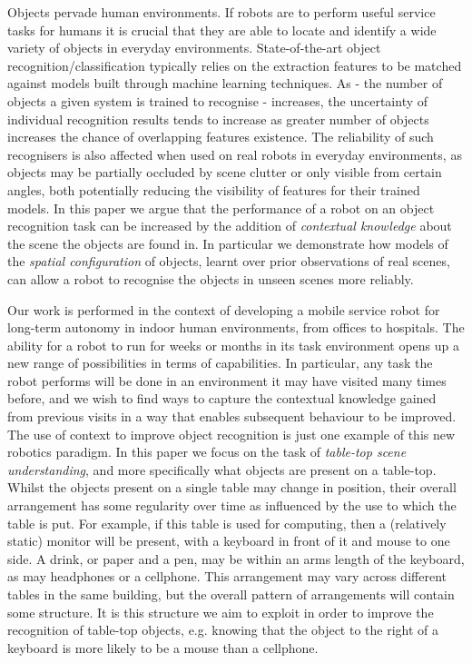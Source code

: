 \documentclass[letterpaper, 10 pt, conference]{ieeeconf}  %
\begin{document}
Objects pervade human environments. If robots are to perform useful service tasks for humans it is crucial that they are able to locate and identify a wide variety of objects in everyday environments. State-of-the-art object recognition/classification typically relies on the extraction features to be matched against models built through machine learning techniques. As - the number of objects a given system is trained to recognise - increases, the uncertainty of individual recognition results tends to increase as greater number of objects increases the chance of overlapping features existence. The reliability of such recognisers is also affected when used on real robots in everyday environments, as objects may be partially occluded by scene clutter or only visible from certain angles, both potentially reducing the visibility of features for their trained models. In this paper we argue that the performance of a robot on an object recognition task can be increased by the addition of \emph{contextual knowledge} about the scene the objects are found in. In particular we demonstrate how models of the \emph{spatial configuration} of objects, learnt over prior observations of real scenes, can allow a robot to recognise the objects in unseen scenes more reliably. 

Our work is performed in the context of developing a mobile service robot for long-term autonomy in indoor human environments, from offices to hospitals. The ability for a robot to run for weeks or months in its task environment opens up a new range of possibilities in terms of capabilities. In particular, any task the robot performs will be done in an environment it may have visited many times before, and we wish to find ways to capture the contextual knowledge gained from previous visits in a way that enables subsequent behaviour to be improved. The use of context to improve object recognition is just one example of this new robotics paradigm. In this paper we focus on the task of \emph{table-top scene understanding}, and more specifically what objects are present on a table-top. Whilst the objects present on a single table may change in position, their overall arrangement has some regularity over time as influenced by the use to which the table is put. For example, if this table is used for computing, then a (relatively static) monitor will be present, with a keyboard in front of it and mouse to one side. A drink, or paper and a pen, may be within an arms length of the keyboard, as may headphones or a cellphone. This arrangement may vary across different tables in the same building, but the overall pattern of arrangements will contain some structure. It is this structure we aim to exploit in order to improve the recognition of table-top objects, e.g. knowing that the object to the right of a keyboard is more likely to be a mouse than a cellphone. 
\end{document}
